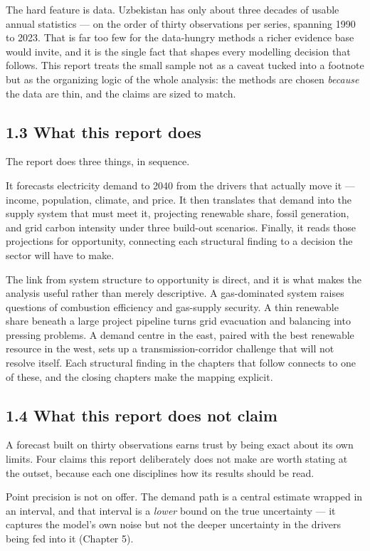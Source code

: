 \documentclass[10pt,twocolumn]{article}
\begin{document}
The hard feature is data. Uzbekistan has only about three decades of usable annual statistics --- on the order of thirty observations per series, spanning 1990 to 2023. That is far too few for the data-hungry methods a richer evidence base would invite, and it is the single fact that shapes every modelling decision that follows. This report treats the small sample not as a caveat tucked into a footnote but as the organizing logic of the whole analysis: the methods are chosen \textit{because} the data are thin, and the claims are sized to match.

\subsection*{1.3 What this report does}

The report does three things, in sequence.

It forecasts electricity demand to 2040 from the drivers that actually move it --- income, population, climate, and price. It then translates that demand into the supply system that must meet it, projecting renewable share, fossil generation, and grid carbon intensity under three build-out scenarios. Finally, it reads those projections for opportunity, connecting each structural finding to a decision the sector will have to make.

The link from system structure to opportunity is direct, and it is what makes the analysis useful rather than merely descriptive. A gas-dominated system raises questions of combustion efficiency and gas-supply security. A thin renewable share beneath a large project pipeline turns grid evacuation and balancing into pressing problems. A demand centre in the east, paired with the best renewable resource in the west, sets up a transmission-corridor challenge that will not resolve itself. Each structural finding in the chapters that follow connects to one of these, and the closing chapters make the mapping explicit.

\subsection*{1.4 What this report does not claim}

A forecast built on thirty observations earns trust by being exact about its own limits. Four claims this report deliberately does not make are worth stating at the outset, because each one disciplines how its results should be read.

Point precision is not on offer. The demand path is a central estimate wrapped in an interval, and that interval is a \textit{lower} bound on the true uncertainty --- it captures the model's own noise but not the deeper uncertainty in the drivers being fed into it (Chapter 5).
\end{document}
